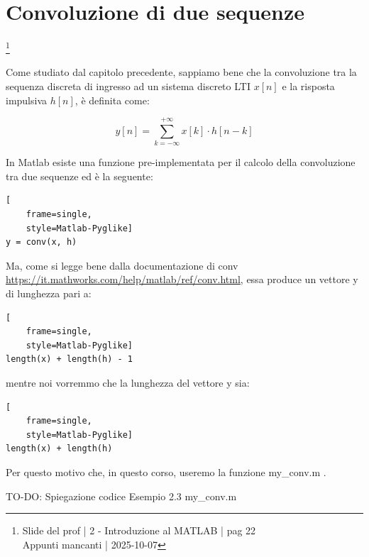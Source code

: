 \newpage 

\section{Convoluzione di due sequenze}

\footnote{ 
    Slide del prof | 2 - Introduzione al MATLAB | pag 22\\
    Appunti mancanti | 2025-10-07 
}

Come studiato dal capitolo precedente, sappiamo bene che 
la convoluzione tra la sequenza discreta di ingresso ad un sistema discreto LTI $x \left[ n\right]$ e la risposta impulsiva $h \left[ n\right]$, 
è definita come: 

{
    \Large 
    \begin{equation}
        y \left[ n\right] 
        = 
        \sum_{k = - \infty}^{+ \infty}
        x \left[ k\right]
        \cdot 
        h \left[ n - k\right]
    \end{equation}
}

In Matlab esiste una funzione pre-implementata per il calcolo della convoluzione tra due sequenze ed è la seguente: 

{
    \Large 
    \begin{lstlisting}[
    frame=single,
    style=Matlab-Pyglike]
y = conv(x, h)
\end{lstlisting}
}

Ma, come si legge bene dalla documentazione di conv \url{https://it.mathworks.com/help/matlab/ref/conv.html}, 
essa produce un vettore y di lunghezza pari a: 

{
    \Large 
    \begin{lstlisting}[
    frame=single,
    style=Matlab-Pyglike]
length(x) + length(h) - 1
\end{lstlisting}
} 

mentre noi vorremmo che la lunghezza del vettore y sia: 

{
    \Large 
    \begin{lstlisting}[
    frame=single,
    style=Matlab-Pyglike]
length(x) + length(h) 
\end{lstlisting}
} 

Per questo motivo che, in questo corso, useremo la funzione my\_conv.m .\newline 

\begin{tcolorbox}[colback=green!5!white,colframe=green!75!black]
TO-DO: Spiegazione codice Esempio 2.3 my\_conv.m
\end{tcolorbox} 

